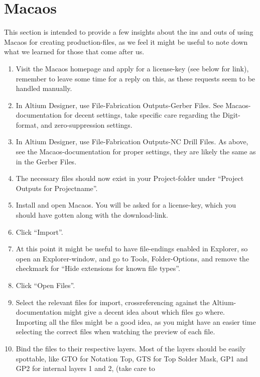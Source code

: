 \section {Macaos}

This section is intended to provide a few insights about the ins and outs of
using Macaos for creating production-files, as we feel it might be useful to
note down what we learned for those that come after us. 

\begin {enumerate}
\item Visit the Macaos homepage and apply for a license-key (see below for
  link), remember to leave some time for a reply on this, as these requests seem
  to be handled manually.
\item In Altium Designer, use File-Fabrication Outputs-Gerber Files. See
  Macaos-documentation for decent settings, take specific care regarding the
  Digit-format, and zero-suppression settings.
\item In Altium Designer, use File-Fabrication Outputs-NC Drill Files. As above,
  see the Macaos-documentation for proper settings, they are likely the same as
  in the Gerber Files.
\item The necessary files should now exist in your Project-folder under
  ``Project Outputs for Projectname''.
\item Install and open Macaos. You will be asked for a license-key, which you
  should have gotten along with the download-link.
\item Click ``Import''.
\item At this point it might be useful to have file-endings enabled in
  Explorer, so open an Explorer-window, and go to Tools, Folder-Options, and
  remove the checkmark for ``Hide extensions for known file types''.
\item Click ``Open Files''.
\item Select the relevant files for import, crossreferencing against the
  Altium-documentation might give a decent idea about which files go where.
  Importing all the files might be a good idea, as you might have an easier time
  selecting the correct files when watching the preview of each file.
\item Bind the files to their respective layers. Most of the layers should be
  easily spottable, like GTO for Notation Top, GTS for Top Solder Mask, GP1 and
  GP2 for internal layers 1 and 2,  (take care to

\end{enumerate}
